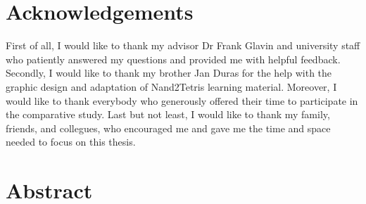 

\setcounter{page}{1}

\rhead{}

\chapter*{Acknowledgements}

First of all, I would like to thank my advisor Dr Frank Glavin and university staff who patiently answered my questions and provided me with helpful feedback.
Secondly, I would like to thank my brother Jan Duras for the help with the graphic design and adaptation of Nand2Tetris learning material.
Moreover, I would like to thank everybody who generously offered their time to participate in the comparative study.
Last but not least, I would like to thank my family, friends, and collegues, who encouraged me and gave me the time and space needed to focus on this thesis.

\glsunsetall %

\tableofcontents

\listoftables

\listoffigures

\glsresetall %

\printglossary[type=\acronymtype, style=long, nonumberlist, title=List of Acronyms]

\chapter*{Abstract}

